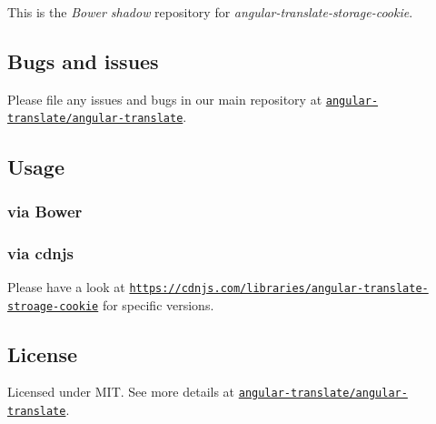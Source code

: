 This is the {\itshape Bower shadow} repository for {\itshape angular-\/translate-\/storage-\/cookie}.

\subsection*{Bugs and issues}

Please file any issues and bugs in our main repository at \href{https://github.com/angular-translate/angular-translate/issues}{\tt angular-\/translate/angular-\/translate}.

\subsection*{Usage}

\subsubsection*{via Bower}




\subsubsection*{via cdnjs}

Please have a look at \href{https://cdnjs.com/libraries/angular-translate-stroage-cookie}{\tt https\+://cdnjs.\+com/libraries/angular-\/translate-\/stroage-\/cookie} for specific versions.

\subsection*{License}

Licensed under M\+IT. See more details at \href{https://github.com/angular-translate/angular-translate}{\tt angular-\/translate/angular-\/translate}. 